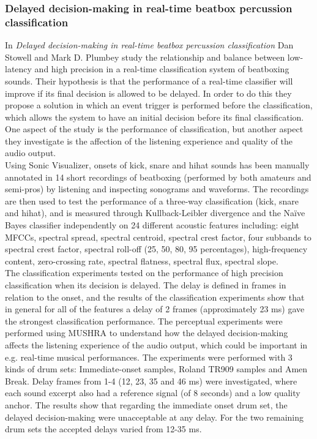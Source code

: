 \subsubsection{Delayed decision-making in real-time beatbox percussion classification}
In \textit{Delayed decision-making in real-time beatbox percussion classification} Dan Stowell and Mark D. Plumbey study the relationship and balance between low-latency and high precision in a real-time classification system of beatboxing sounds. Their hypothesis is that the performance of a real-time classifier will improve if its final decision is allowed to be delayed. 
In order to do this they propose a solution in which an event trigger is performed before the classification, which allows the system to have an initial decision before its final classification. One aspect of the study is the performance of classification, but another aspect they investigate is the affection of the listening experience and quality of the audio output. \\
Using Sonic Visualizer, onsets of kick, snare and hihat sounds has been manually annotated in 14 short recordings of beatboxing (performed by both amateurs and semi-pros) by listening and inspecting sonograms and waveforms. The recordings are then used to test the performance of a three-way classification (kick, snare and hihat), and is measured through Kullback-Leibler divergence and the Naïve Bayes classifier independently on 24 different acoustic features including: eight MFCCs, spectral spread, spectral centroid, spectral crest factor, four subbands to spectral crest factor, spectral roll-off (25, 50, 80, 95 percentages), high-frequency content, zero-crossing rate, spectral flatness, spectral flux, spectral slope.\\
The classification experiments tested on the performance of high precision classification when its decision is delayed.
The delay is defined in frames in relation to the onset, and the results of the classification experiments show that in general for all of the features a delay of 2 frames (approximately 23 ms) gave the strongest classification performance.
The perceptual experiments were performed using MUSHRA to understand how the delayed decision-making affects the listening experience of the audio output, which could be important in e.g. real-time musical performances. The experiments were performed with 3 kinds of drum sets: Immediate-onset samples, Roland TR909 samples and Amen Break. Delay frames from 1-4 (12, 23, 35 and 46 ms) were investigated, where each sound excerpt also had a reference signal (of 8 seconds) and a low quality anchor. The results show that regarding the immediate onset drum set, the delayed decision-making were unacceptable at any delay. For the two remaining drum sets the accepted delays varied from 12-35 ms.\\
